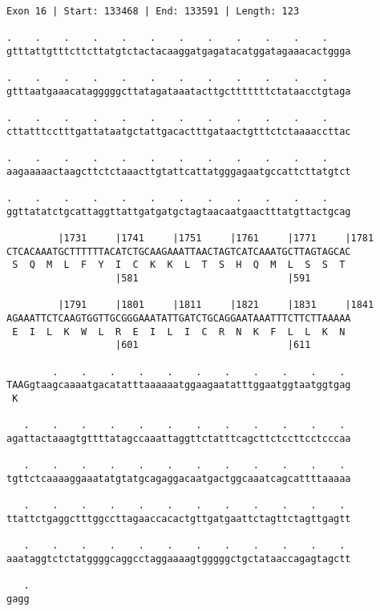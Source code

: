 \documentclass{article}
\begin{document}
\begin{Verbatim}
Exon 16 | Start: 133468 | End: 133591 | Length: 123
 
.    .    .    .    .    .    .    .    .    .    .    .    
gtttattgtttcttcttatgtctactacaaggatgagatacatggatagaaacactggga
  
.    .    .    .    .    .    .    .    .    .    .    .    
gtttaatgaaacatagggggcttatagataaatacttgctttttttctataacctgtaga
  
.    .    .    .    .    .    .    .    .    .    .    .    
cttatttcctttgattataatgctattgacactttgataactgtttctctaaaaccttac
  
.    .    .    .    .    .    .    .    .    .    .    .    
aagaaaaactaagcttctctaaacttgtattcattatgggagaatgccattcttatgtct
  
.    .    .    .    .    .    .    .    .    .    .    .    
ggttatatctgcattaggttattgatgatgctagtaacaatgaactttatgttactgcag
  
         |1731     |1741     |1751     |1761     |1771     |1781
CTCACAAATGCTTTTTTACATCTGCAAGAAATTAACTAGTCATCAAATGCTTAGTAGCAC
 S  Q  M  L  F  Y  I  C  K  K  L  T  S  H  Q  M  L  S  S  T 
                   |581                          |591       
  
         |1791     |1801     |1811     |1821     |1831     |1841
AGAAATTCTCAAGTGGTTGCGGGAAATATTGATCTGCAGGAATAAATTTCTTCTTAAAAA
 E  I  L  K  W  L  R  E  I  L  I  C  R  N  K  F  L  L  K  N 
                   |601                          |611       
  
        .    .    .    .    .    .    .    .    .    .    . 
TAAGgtaagcaaaatgacatatttaaaaaatggaagaatatttggaatggtaatggtgag
 K                                                          
  
   .    .    .    .    .    .    .    .    .    .    .    . 
agattactaaagtgttttatagccaaattaggttctatttcagcttctccttcctcccaa
  
   .    .    .    .    .    .    .    .    .    .    .    . 
tgttctcaaaaggaaatatgtatgcagaggacaatgactggcaaatcagcattttaaaaa
  
   .    .    .    .    .    .    .    .    .    .    .    . 
ttattctgaggctttggccttagaaccacactgttgatgaattctagttctagttgagtt
  
   .    .    .    .    .    .    .    .    .    .    .    . 
aaataggtctctatggggcaggcctaggaaaagtgggggctgctataaccagagtagctt
  
   .
gagg
\end{Verbatim}
\newpage
\end{document}
